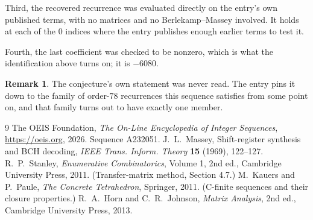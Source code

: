 \documentclass[11pt,a4paper]{article}
\theoremstyle{plain}
\theoremstyle{definition}
\newtheorem{remark}[theorem]{Remark}
\begin{document}
Third, the recovered recurrence was evaluated directly on the entry's own published terms, with
no matrices and no Berlekamp--Massey involved. It holds at each of the $0$ indices where
the entry publishes enough earlier terms to test it.

Fourth, the last coefficient was checked to be nonzero, which is what the identification above
turns on; it is $-6080$.

\begin{remark}
The conjecture's own statement was never read. The entry pins it down to the family of
order-$78$ recurrences this sequence satisfies from some point on, and that family turns
out to have exactly one member.
\end{remark}

\begin{thebibliography}{9}
 The OEIS Foundation, \emph{The On-Line Encyclopedia of Integer
Sequences}, \url{https://oeis.org}, 2026. Sequence A232051.
 J.~L.~Massey, Shift-register synthesis and BCH decoding, \emph{IEEE
Trans. Inform. Theory} \textbf{15} (1969), 122--127.
 R.~P.~Stanley, \emph{Enumerative Combinatorics}, Volume 1, 2nd ed.,
Cambridge University Press, 2011. (Transfer-matrix method, Section 4.7.)
 M.~Kauers and P.~Paule, \emph{The Concrete Tetrahedron}, Springer, 2011.
(C-finite sequences and their closure properties.)
 R.~A.~Horn and C.~R.~Johnson, \emph{Matrix Analysis}, 2nd ed., Cambridge
University Press, 2013.
\end{thebibliography}
\end{document}
